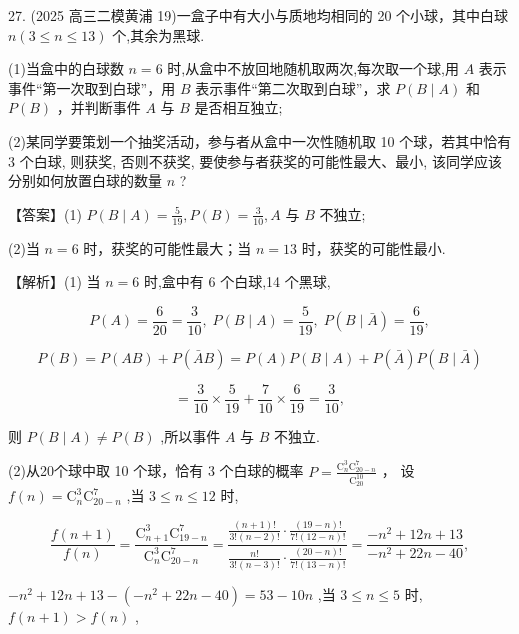 \documentclass[10pt]{article}
\begin{document}
27. (2025 高三二模黄浦 19)一盒子中有大小与质地均相同的 20 个小球，其中白球 \(n\left( {3 \leq  n \leq  {13}}\right)\) 个,其余为黑球.

(1)当盒中的白球数 \(n = 6\) 时,从盒中不放回地随机取两次,每次取一个球,用 \(A\) 表示事件“第一次取到白球”，用 \(B\) 表示事件“第二次取到白球”，求 \(P\left( {B \mid  A}\right)\) 和 \(P\left( B\right)\) ，并判断事件 \(A\) 与 \(B\) 是否相互独立;

(2)某同学要策划一个抽奖活动，参与者从盒中一次性随机取 10 个球，若其中恰有 3 个白球, 则获奖, 否则不获奖, 要使参与者获奖的可能性最大、最小, 该同学应该分别如何放置白球的数量 \(n\) ?

【答案】(1) \(P\left( {B \mid  A}\right)  = \frac{5}{19},P\left( B\right)  = \frac{3}{10},A\) 与 \(B\) 不独立;

(2)当 \(n = 6\) 时，获奖的可能性最大；当 \(n = {13}\) 时，获奖的可能性最小.

【解析】(1) 当 \(n = 6\) 时,盒中有 6 个白球,14 个黑球,

\[
P\left( A\right)  = \frac{6}{20} = \frac{3}{10},\;P\left( {B \mid  A}\right)  = \frac{5}{19},\;P\left( {B \mid  \bar{A}}\right)  = \frac{6}{19},
\]

\[
P\left( B\right)  = P\left( {AB}\right)  + P\left( {\bar{A}B}\right)  = P\left( A\right) P\left( {B \mid  A}\right)  + P\left( \bar{A}\right) P\left( {B \mid  \bar{A}}\right)
\]

\[
= \frac{3}{10} \times  \frac{5}{19} + \frac{7}{10} \times  \frac{6}{19} = \frac{3}{10},
\]

则 \(P\left( {B \mid  A}\right)  \neq  P\left( B\right)\) ,所以事件 \(A\) 与 \(B\) 不独立.

(2)从20个球中取 10 个球，恰有 3 个白球的概率 \(P = \frac{{\mathrm{C}}_{n}^{3}{\mathrm{C}}_{{20} - n}^{7}}{{\mathrm{C}}_{20}^{10}}\) ， 设 \(f\left( n\right)  = {\mathrm{C}}_{n}^{3}{\mathrm{C}}_{{20} - n}^{7}\) ,当 \(3 \leq  n \leq  {12}\) 时,

\[
\frac{f\left( {n + 1}\right) }{f\left( n\right) } = \frac{{\mathrm{C}}_{n + 1}^{3}{\mathrm{C}}_{{19} - n}^{7}}{{\mathrm{C}}_{n}^{3}{\mathrm{C}}_{{20} - n}^{7}} = \frac{\frac{\left( {n + 1}\right) !}{3!\left( {n - 2}\right) !} \cdot  \frac{\left( {{19} - n}\right) !}{7!\left( {{12} - n}\right) !}}{\frac{n!}{3!\left( {n - 3}\right) !} \cdot  \frac{\left( {{20} - n}\right) !}{7!\left( {{13} - n}\right) !}} = \frac{-{n}^{2} + {12n} + {13}}{-{n}^{2} + {22n} - {40}},
\]

\(- {n}^{2} + {12n} + {13} - \left( {-{n}^{2} + {22n} - {40}}\right)  = {53} - {10n}\) ,当 \(3 \leq  n \leq  5\) 时, \(f\left( {n + 1}\right)  > f\left( n\right)\) ,
\end{document}
